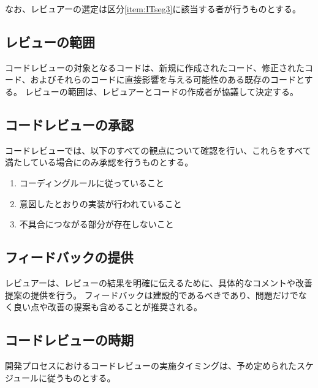 なお、レビュアーの選定は区分\ref{item:ITseg3}\hx に該当する者が行うものとする。

\subsection{レビューの範囲}
コードレビューの対象となるコードは、新規に作成されたコード、修正されたコード、およびそれらのコードに直接影響を与える可能性のある既存のコードとする。
レビューの範囲は、レビュアーとコードの作成者が協議して決定する。

\subsection{コードレビューの承認}
コードレビューでは、以下のすべての観点について確認を行い、これらをすべて満たしている場合にのみ承認を行うものとする。
\begin{enumerate}
\item コーディングルールに従っていること
\item 意図したとおりの実装が行われていること
\item 不具合につながる部分が存在しないこと
\end{enumerate}

\subsection{フィードバックの提供}
レビュアーは、レビューの結果を明確に伝えるために、具体的なコメントや改善提案の提供を行う。
フィードバックは建設的であるべきであり、問題だけでなく良い点や改善の提案も含めることが推奨される。

\subsection{コードレビューの時期}
開発プロセスにおけるコードレビューの実施タイミングは、予め定められたスケジュールに従うものとする。



